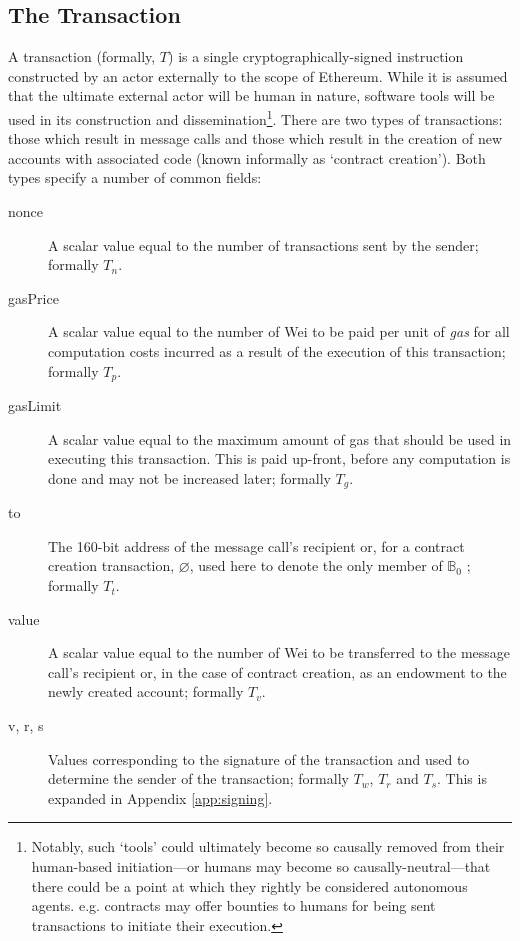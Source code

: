 \documentclass[9pt,oneside]{amsart}
\makeatletter
\newcommand*\eg{e.g.\@\xspace}
\makeatother
\begin{document}
\begin{multicols}{2}
\subsection{The Transaction} \label{ch:transaction}

A transaction (formally, $T$) is a single cryptographically-signed instruction constructed by an actor externally to the scope of Ethereum. While it is assumed that the ultimate external actor will be human in nature, software tools will be used in its construction and dissemination\footnote{Notably, such `tools' could ultimately become so causally removed from their human-based initiation---or humans may become so causally-neutral---that there could be a point at which they rightly be considered autonomous agents. \eg contracts may offer bounties to humans for being sent transactions to initiate their execution.}. There are two types of transactions: those which result in message calls and those which result in the creation of new accounts with associated code (known informally as `contract creation'). Both types specify a number of common fields:

\begin{description}
\item[nonce] A scalar value equal to the number of transactions sent by the sender; formally $T_n$.
\item[gasPrice] A scalar value equal to the number of Wei to be paid per unit of \textit{gas} for all computation costs incurred as a result of the execution of this transaction; formally $T_p$.
\item[gasLimit] A scalar value equal to the maximum amount of gas that should be used in executing this transaction. This is paid up-front, before any computation is done and may not be increased later; formally $T_g$.
\item[to] The 160-bit address of the message call's recipient or, for a contract creation transaction, $\varnothing$, used here to denote the only member of $\mathbb{B}_0$ ; formally $T_t$.
\item[value] A scalar value equal to the number of Wei to be transferred to the message call's recipient or, in the case of contract creation, as an endowment to the newly created account; formally $T_v$.
\item[v, r, s] Values corresponding to the signature of the transaction and used to determine the sender of the transaction; formally $T_w$, $T_r$ and $T_s$. This is expanded in Appendix \ref{app:signing}.
\end{description}


\end{multicols}
\end{document}
